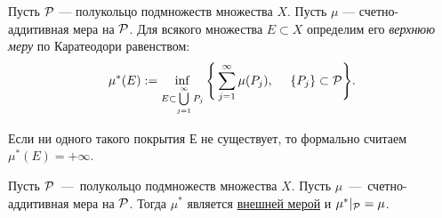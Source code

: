 \hypertarget{uppermeasure}{}
\begin{definition}
    Пусть $\mathcal{P}$ --- полукольцо подмножеств множества $X$. Пусть $\mu$ --- счетно-аддитивная мера на $\mathcal{P}$. Для всякого множества $E \subset X$ определим его \textit{верхнюю меру} по Каратеодори равенством:
    \[
    \mu^*(E) := \inf_{E \subset \bigcup\limits_{j = 1}^{\infty}{P_j}} \Bigg\{\sum\limits_{j = 1}^{\infty}{\mu(P_j)},~~~~{\{P_j\} \subset \mathcal{P}} \Bigg\}.
    \label{def:mu}
    \]
    
    \remark Если ни одного такого покрытия Е не существует, то формально считаем $\mu^*(E) = +\infty$.
\end{definition}

\begin{theorem}
    \label{theorem10}
    Пусть $\mathcal{P}$~---~полукольцо подмножеств множества $X$. Пусть $\mu$~---~счетно-аддитивная мера на $\mathcal{P}$. Тогда $\mu^*$ является \hyperlink{outmeasure}{внешней мерой} и $\mu^*|_{\mathcal{P}} = \mu$.
\end{theorem}
